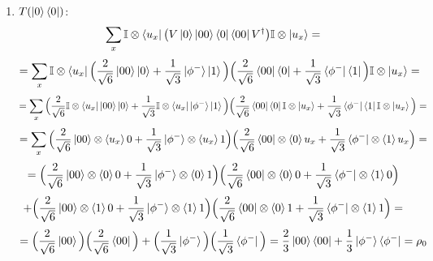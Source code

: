 \documentclass[12pt]{article}
\begin{document}
\begin{enumerate}
\begin{enumerate}
    \item $T(\ket{0}\bra{0})$:
$$ 
\sum_x \mathbb{I}\otimes \bra{u_x} \big(V \ket{0}\ket{00}\bra{0}\bra{00} V^\dagger \big)\mathbb{I}\otimes \ket{u_x} = $$
$$ = \sum_x \mathbb{I}\otimes \bra{u_x} 
\Big(
\frac{2}{\sqrt{6}} \ket{00}\ket{0} + \frac{1}{\sqrt{3}} \ket{\phi^-}\ket{1}\Big)
\Big(
\frac{2}{\sqrt{6}} \bra{00}\bra{0} + \frac{1}{\sqrt{3}} \bra{\phi^-}\bra{1}\Big)
\mathbb{I}\otimes \ket{u_x} =
$$
$$= \sum_x 
\Big(
\frac{2}{\sqrt{6}} \mathbb{I}\otimes \bra{u_x} \ket{00}\ket{0} + \frac{1}{\sqrt{3}} \mathbb{I}\otimes \bra{u_x} \ket{\phi^-}\ket{1}\Big)
\Big(
\frac{2}{\sqrt{6}} \bra{00}\bra{0} \mathbb{I}\otimes \ket{u_x} + \frac{1}{\sqrt{3}} \bra{\phi^-}\bra{1} \mathbb{I}\otimes \ket{u_x}\Big)
 =
$$
$$= \sum_x 
\Big(
\frac{2}{\sqrt{6}} \ket{00}\otimes\braket{u_x}{0} + \frac{1}{\sqrt{3}} \ket{\phi^-}\otimes \braket{u_x}{1}\Big)
\Big(
\frac{2}{\sqrt{6}} \bra{00}\otimes \braket{0}{u_x} + \frac{1}{\sqrt{3}} \bra{\phi^-}\otimes \braket{1}{u_x}\Big) = $$
$$= 
\Big(
\frac{2}{\sqrt{6}} \ket{00}\otimes\braket{0}{0} + \frac{1}{\sqrt{3}} \ket{\phi^-}\otimes \braket{0}{1}\Big)
\Big(
\frac{2}{\sqrt{6}} \bra{00}\otimes \braket{0}{0} + \frac{1}{\sqrt{3}} \bra{\phi^-}\otimes \braket{1}{0}\Big) $$ 
$$ + 
\Big(
\frac{2}{\sqrt{6}} \ket{00}\otimes\braket{1}{0} + \frac{1}{\sqrt{3}} \ket{\phi^-}\otimes \braket{1}{1}\Big)
\Big(
\frac{2}{\sqrt{6}} \bra{00}\otimes \braket{0}{1} + \frac{1}{\sqrt{3}} \bra{\phi^-}\otimes \braket{1}{1}\Big)= $$
$$= 
\Big(
\frac{2}{\sqrt{6}} \ket{00} \Big)
\Big(
\frac{2}{\sqrt{6}} \bra{00} \Big) + 
\Big(
\frac{1}{\sqrt{3}} \ket{\phi^-}\Big)
\Big(
\frac{1}{\sqrt{3}} \bra{\phi^-}\Big)= \frac{2}{3} \ket{00}\bra{00} + \frac{1}{3} \ket{\phi^-}\bra{\phi^-} = \rho_0 $$


\end{enumerate}
\end{enumerate}
\end{document}
